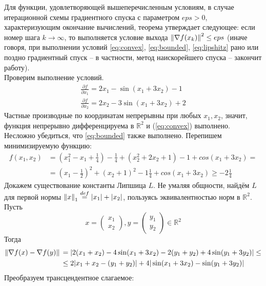 \documentclass[main.tex]{subfiles}
\begin{document}
Для функции, удовлетворяющей вышеперечисленным условиям, в случае итерационной схемы градиентного спуска с параметром $eps > 0$, характеризующим окончание вычислений, теорема утверждает следующее: 
если номер шага $k\rightarrow \infty$, то выполняется условие выхода $\left\lVert\nabla f(x_k)\right\rVert^2 \le eps$  (иначе говоря, при выполнении условий \ref{eq:convex}, \ref{eq:bounded}, \ref{eq:lipshitz} рано или поздно градиентный спуск -- в частности, метод наискорейшего спуска -- закончит работу).\\
Проверим выполнение условий.\\
\begin{gather*}
\frac{\partial f}{\partial x_1} = 2x_1 - \sin(x_1+3x_2)-1\\
\frac{\partial f}{\partial x_2} = 2x_2 - 3\sin(x_1+3x_2)+2
\end{gather*}
Частные производные по координатам непрерывны при любых $x_1, x_2$, значит, функция непрерывно дифференцируема в $\mathds{R}^2$ и (\ref{eq:convex}) выполнено.\\
Несложно убедиться, что \ref{eq:bounded} также выполнено. Перепишем минимизируемую функцию:
\begin{equation*}
\begin{aligned} %
f(x_1, x_2) {}& = (x_1^2-x_1+\frac{1}{4})-\frac{1}{4}+(x_2^2+2x_2+1)-1 + cos(x_1+3x_2) = \\
 & = (x_1-\frac{1}{2})^2+(x_2+1)^2-1\frac{1}{4}+cos(x_1+3x_2)\ge -2\frac{1}{4}
\end{aligned}
\end{equation*}
Докажем существование константы Липшица $L$. Не умаляя общности, найдём $L$ для первой нормы $\left\lVert x\right\rVert_1\overset{def}{=}|x_1|+|x_2|$, пользуясь эквивалентностью норм в $\mathds{R}^2$. Пусть
\begin{equation*}
x=\begin{pmatrix}x_1\\x_2\end{pmatrix}, y=\begin{pmatrix}y_1\\y_2\end{pmatrix} \in \mathds{R}^2 
\end{equation*}
Тогда
\begin{equation*}
\begin{aligned}
\left\lVert\nabla f(x) - \nabla f(y)\right\rVert {}& = |2(x_1+x_2)-4\sin(x_1+3x_2) -2(y_1+y_2)+4\sin(y_1+3y_2)| \le \\
& \le 2|x_1+x_2-(y_1+y_2)|+4|\sin(x_1+3x_2)-\sin(y_1+3y_2)|  
\end{aligned}
\end{equation*}
Преобразуем трансцендентное слагаемое:
\end{document}
